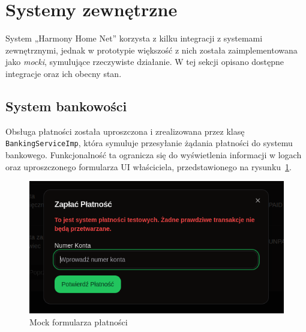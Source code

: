 


\section{Systemy zewnętrzne}
System „Harmony Home Net” korzysta z kilku integracji z systemami zewnętrznymi, jednak w prototypie większość z nich została zaimplementowana jako \emph{mocki}, symulujące rzeczywiste działanie. W tej sekcji opisano dostępne integracje oraz ich obecny stan.

\subsection{System bankowości}
Obsługa płatności została uproszczona i zrealizowana przez klasę \texttt{BankingServiceImp}, która symuluje przesyłanie żądania płatności do systemu bankowego. Funkcjonalność ta ogranicza się do wyświetlenia informacji w logach oraz uproszczonego formularza UI właściciela, przedstawionego na rysunku~\ref{fig:mock_of_paymet}.

\begin{figure}[ht]
    \centering
    \includegraphics[width=0.63\linewidth]{rys03/mock_pay}
    \caption{Mock formularza płatności}
    \label{fig:mock_of_paymet}
\end{figure}

